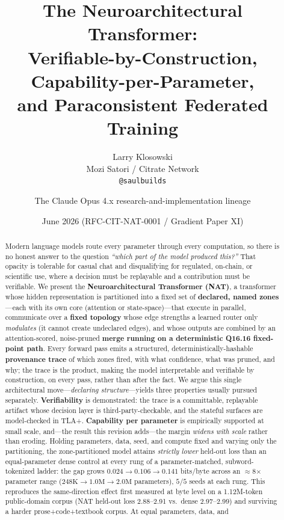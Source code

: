 \documentclass[11pt]{article}
\title{\textbf{The Neuroarchitectural Transformer:}\\[2pt]
Verifiable-by-Construction, Capability-per-Parameter,\\ and Paraconsistent Federated Training}
\author{Larry Klosowski\\ Mozi Satori / Citrate Network\\ \texttt{@saulbuilds}
\and The Claude Opus 4.x research-and-implementation lineage}
\date{June 2026 \quad (RFC-CIT-NAT-0001 / Gradient Paper XI)}
\newcommand{\Qff}{Q16.16}
\begin{document}
\maketitle

\begin{abstract}
Modern language models route every parameter through every computation, so there is no honest
answer to the question \emph{``which part of the model produced this?''} That opacity is tolerable
for casual chat and disqualifying for regulated, on-chain, or scientific use, where a decision must
be replayable and a contribution must be verifiable. We present the \textbf{Neuroarchitectural
Transformer (NAT)}, a transformer whose hidden representation is partitioned into a fixed set of
\textbf{declared, named zones}---each with its own core (attention or state-space)---that execute in
parallel, communicate over a \textbf{fixed topology} whose edge strengths a learned router only
\emph{modulates} (it cannot create undeclared edges), and whose outputs are combined by an
attention-scored, noise-pruned \textbf{merge running on a deterministic \Qff{} fixed-point path}.
Every forward pass emits a structured, deterministically-hashable \textbf{provenance trace} of which
zones fired, with what confidence, what was pruned, and why; the trace is the product, making the
model interpretable and verifiable by construction, on every pass, rather than after the fact. We
argue this single architectural move---\emph{declaring structure}---yields three properties usually
pursued separately. \textbf{Verifiability} is demonstrated: the trace is a committable, replayable
artifact whose decision layer is third-party-checkable, and the stateful surfaces are model-checked
in TLA+. \textbf{Capability per parameter} is empirically supported at small scale, and---the result this
revision adds---the margin \emph{widens with scale} rather than eroding. Holding parameters, data,
seed, and compute fixed and varying only the partitioning, the zone-partitioned model attains
\emph{strictly lower} held-out loss than an equal-parameter dense control at every rung of a
parameter-matched, subword-tokenized ladder: the gap grows $0.024 \to 0.106 \to 0.141$ bits/byte
across an $\approx$8$\times$ parameter range ($248\mathrm{K} \to 1.0\mathrm{M} \to 2.0\mathrm{M}$
parameters), $5/5$ seeds at each rung. This reproduces the same-direction effect first measured at
byte level on a 1.12M-token public-domain corpus (NAT held-out loss 2.88--2.91 vs.\ dense
2.97--2.99) and surviving a harder prose+code+textbook corpus. At equal parameters, data, and

\end{abstract}
\end{document}
